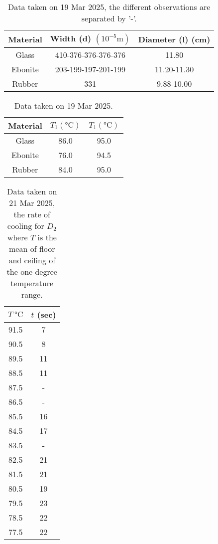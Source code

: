 \documentclass[%
 reprint,
 sor,
 jor,
 amsmath,amssymb,
 aps,
]{revtex4-2}
\begin{document}
\begin{table}[h]
\centering
\begin{tabular}{|c|c|c|}
    \hline
    Material & Width (d) $(10^{-5} \si{\meter})$  & Diameter (l) (cm) \\
    \hline
    Glass	& 410-376-376-376-376 & 11.80\\
    Ebonite 	& 203-199-197-201-199 & 11.20-11.30\\
    Rubber 	& 331 & 9.88-10.00\\
    \hline
\end{tabular}
\caption{Data taken on 19 Mar 2025, the different observations are separated by '-'.}

\end{table}


\begin{table}[h]
\centering
\begin{tabular}{|c|c|c|}
    \hline
    Material & $T_1 (\si{\celsius})$  &  $T_1 (\si{\celsius})$ \\
    \hline
    Glass	& 86.0 & 95.0\\
    Ebonite 	& 76.0& 94.5\\
    Rubber 	& 84.0& 95.0 \\
    \hline
\end{tabular}
\caption{Data taken on 19 Mar 2025.}
\end{table}
\begin{table}[H]
\label{tab:}
\centering
  \begin{tabular}{|c|c|}
	  \hline
	  $T~\si{\celsius}$   &  $t$ (sec)\\
	  \hline
 91.5   &7 \\
	  90.5 & 8 \\
	  89.5 & 11 \\
	  88.5 & 11 \\
	  87.5 & - \\
	  86.5 & - \\
	  85.5 & 16 \\
	  84.5 & 17 \\
	  83.5 & - \\
	  82.5 & 21 \\
	  81.5 & 21 \\
	  80.5 & 19 \\
	  79.5 & 23 \\
	  78.5 & 22 \\
	  77.5 & 22 \\
	  \hline
  \end{tabular}
  \caption{Data taken on 21 Mar 2025, the rate of cooling for $D_2$ where $T$ is the mean of floor and ceiling of the one degree temperature range.}
\end{table}
\end{document}

